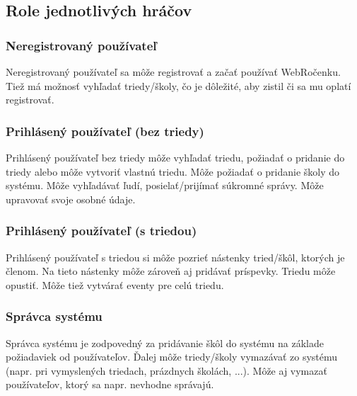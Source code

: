 \documentclass[slovak, 12pt, Times New Roman]{article}
\begin{document}
		\subsection{Role jednotlivých hráčov}
			\subsubsection{Neregistrovaný používateľ}
				Neregistrovaný používateľ sa môže registrovať a začať používať WebRočenku. Tiež má možnosť vyhľadať triedy/školy, čo je dôležité, aby zistil či sa mu oplatí registrovať. 
			\subsubsection{Prihlásený používateľ (bez triedy)}
				Prihlásený používateľ bez triedy môže vyhľadať triedu, požiadať o pridanie do triedy alebo môže vytvoriť vlastnú triedu. Môže požiadať o pridanie školy do systému. Môže vyhľadávať ľudí, posielať/prijímať súkromné správy. Môže upravovať svoje osobné údaje.
			\subsubsection{Prihlásený používateľ (s triedou)}
				Prihlásený používateľ s triedou si môže pozrieť nástenky tried/škôl, ktorých je členom. Na tieto nástenky môže zároveň aj pridávať príspevky. Triedu môže opustiť. Môže tiež vytvárať eventy pre celú triedu.
			\subsubsection{Správca systému}
				Správca systému je zodpovedný za pridávanie škôl do systému na základe požiadaviek od používateľov. Ďalej môže triedy/školy vymazávať zo systému (napr. pri vymyslených triedach, prázdnych školách, ...). Môže aj vymazať používateľov, ktorý sa napr. nevhodne správajú.
\end{document}
